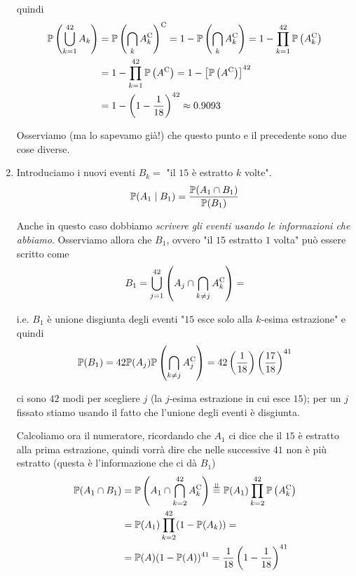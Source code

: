 \begin{enumerate}
quindi
\begin{align*}
\mathbb{P}\left(\bigcup _{k=1}^{42} A_{k}\right) & =\mathbb{P}\left(\bigcap _{k} A_{k}^{\mathrm{C}}\right)^{\mathrm{C}} =1-\mathbb{P}\left(\bigcap _{k} A_{k}^{\mathrm{C}}\right) =1-\prod _{k=1}^{42}\mathbb{P}\left( A_{k}^{\mathrm{C}}\right)\\
 & =1-\prod _{k=1}^{42}\mathbb{P}\left( A^{\mathrm{C}}\right) =1-\left[\mathbb{P}\left( A^{\mathrm{C}}\right)\right]^{42}\\
 & =1-\left( 1-\frac{1}{18}\right)^{42} \approx 0.9093
\end{align*}

\begin{oss}
Osserviamo (ma lo sapevamo già!) che questo punto e il precedente sono due cose diverse.
\end{oss}
\item Introduciamo i nuovi eventi $B_{k} =$ "il $15$ è estratto $k$ volte".\begin{equation*}
\mathbb{P}( A_{1} \mid B_{1}) =\frac{\mathbb{P}( A_{1} \cap B_{1})}{\mathbb{P}( B_{1})}
\end{equation*}

Anche in questo caso dobbiamo \textit{scrivere gli eventi usando le informazioni che abbiamo}. Osserviamo allora che $B_{1}$, ovvero "il $15$ estratto $1$ volta" può essere scritto come
\begin{equation*}
B_{1} =\bigcup _{j=1}^{42}\left( A_{j} \cap \bigcap _{k\neq j} A_{k}^{\mathrm{C}}\right) =
\end{equation*}

i.e. $B_{1}$ è unione disgiunta degli eventi "$15$ esce solo alla $k$-esima estrazione" e quindi
\begin{equation*}
\mathbb{P}( B_{1}) =42\mathbb{P}( A_{j})\mathbb{P}\left(\bigcap _{k\neq j} A_{j}^{\mathrm{C}}\right) =42\left(\frac{1}{18}\right)\left(\frac{17}{18}\right)^{41}
\end{equation*}

ci sono $42$ modi per scegliere $j$ (la $j$-esima estrazione in cui esce $15$); per un $j$ fissato stiamo usando il fatto che l'unione degli eventi è disgiunta.

Calcoliamo ora il numeratore, ricordando che $A_{1}$ ci dice che il $15$ è estratto alla prima estrazione, quindi vorrà dire che nelle successive $41$ non è più estratto (questa è l'informazione che ci dà $B_{1}$)\begin{align*}
\mathbb{P}( A_{1} \cap B_{1}) & =\mathbb{P}\left( A_{1} \cap \bigcap _{k=2}^{42} A_{k}^{\mathrm{C}}\right)\overset{\perp \!\!\! \perp }{=}\mathbb{P}( A_{1})\prod _{k=2}^{42}\mathbb{P}\left( A_{k}^{\mathrm{C}}\right)\\
 & =\mathbb{P}( A_{1})\prod _{k=2}^{42}( 1-\mathbb{P}( A_{k})) =\\
 & =\mathbb{P}( A)( 1-\mathbb{P}( A))^{41} =\frac{1}{18}\left( 1-\frac{1}{18}\right)^{41}
\end{align*}


\end{enumerate}
